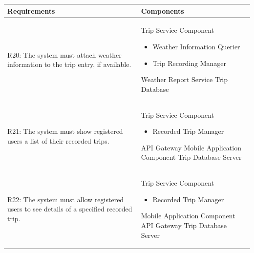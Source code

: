 \newpage
\begin{table}[ht]
\begin{tabular}{|p{9cm}|p{6cm}|}
\hline
\textbf{Requirements}      & \multicolumn{1}{l|}{\textbf{Components}}\\ \hline
R20: The system must attach weather information to the trip entry, if available. 
&
Trip Service Component
\begin{itemize}
    \item Weather Information Querier
    \item Trip Recording Manager
\end{itemize}
Weather Report Service
\newline
Trip Database
\\ \hline
R21: The system must show registered users a list of their recorded trips. 
&
Trip Service Component
\begin{itemize}
    \item Recorded Trip Manager
\end{itemize}
API Gateway
\newline
Mobile Application Component
\newline
Trip Database Server
\\ \hline
R22: The system must allow registered users to see details of a specified recorded trip.
&
Trip Service Component
\begin{itemize}
    \item Recorded Trip Manager
\end{itemize}
Mobile Application Component
\newline
API Gateway
\newline
Trip Database Server
\\ \hline
\end{tabular}
\end{table}

\newpage
